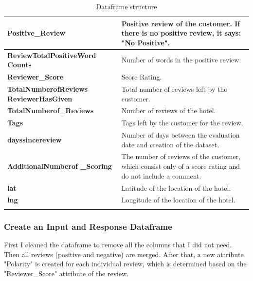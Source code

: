 \begin{longtable}[ c ]{| m{5cm} | m{8cm}|}
\textbf{Positive\_Review}                     & Positive review of the customer. If there is no positive review, it says: "No Positive". \\ \hline
\textbf{ReviewTotalPositiveWord Counts}        & Number of words in the positive review.                                                        \\ \hline
\textbf{Reviewer\_Score}                      & Score Rating.                                                                                \\ \hline
\textbf{TotalNumberofReviews ReviewerHasGiven} & Total number of reviews left by the customer.                                  \\ \hline
\textbf{TotalNumberof\_Reviews}               & Number of reviews of the hotel.                                                                   \\ \hline
\textbf{Tags}                                 & Tags left by the customer for the review.                                                 \\ \hline
\textbf{dayssincereview}                      & Number of days between the evaluation date and creation of the \gls{dataset}.                              \\ \hline
\textbf{AdditionalNumberof \_Scoring} & The number of reviews of the customer, which consist only of a score rating and do not include a comment. \\ \hline
\textbf{lat}                                  & Latitude of the location of the hotel.                                                                 \\ \hline
\textbf{lng}                                  & Longitude of the location of the hotel.                                                                  \\ \hline
\caption{Dataframe structure}
\label{tab:Dataframe structure}\\
\end{longtable}

\subsubsection{Create an Input and Response Dataframe}
First I cleaned the dataframe to remove all the columns that I did not need.
Then all reviews (positive and negative) are merged.
After that, a new attribute "Polarity" is created for each individual review, which is determined based on the "Reviewer\_Score" attribute of the review.

